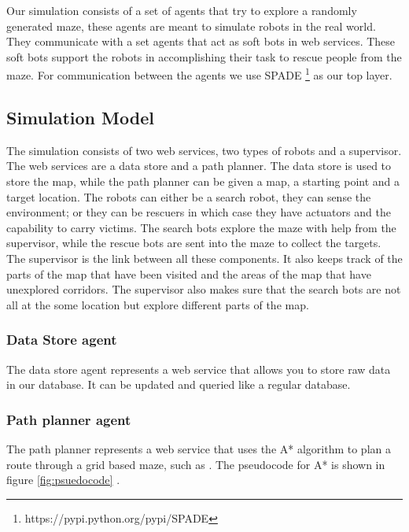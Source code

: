 Our simulation consists of a set of agents that try to explore a randomly
generated maze, these agents are meant to simulate robots in the real world. 
They communicate with a set agents that act as soft bots in web services. These
soft bots support the robots in accomplishing their task to rescue people from
the maze. For communication between the agents we use SPADE \footnote{https://pypi.python.org/pypi/SPADE} as our top layer.

\subsection{Simulation Model}
The simulation consists of two web services, two types of robots and a
supervisor. The web services are a data store and a path planner. The data
store is used to store the map, while the path planner can be given a map, a
starting point and a target location. The robots can either be a search robot,
they can sense the environment; or they can be rescuers in which case they have
actuators and the capability to carry victims. The search bots explore the maze
with help from the supervisor, while the rescue bots are sent into the maze to
collect the targets. The supervisor is the link between all these components.
It also keeps track of the parts of the map that have been visited and the
areas of the map that have unexplored corridors. The supervisor also makes sure
that the search bots are not all at the some location but explore different
parts of the map.

\subsubsection{Data Store agent}
The data store agent represents a web service that allows you to store raw data in our database. It can be updated and queried like a regular database.  

\subsubsection{Path planner agent}
The path planner represents a web service that uses the A* algorithm
\cite{astar} to plan a route through a grid based maze, such as
\cite{astarweb}. The pseudocode for A* is shown in figure \ref{fig:psuedocode} .

